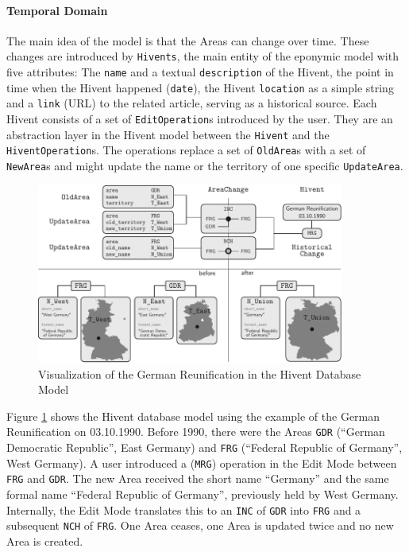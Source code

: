 
\paragraph{Temporal Domain} %
\label{par:temporal_domain}

The main idea of the model is that the Areas can change over time. These changes are introduced by \texttt{Hivents}, the main entity of the eponymic model with five attributes: The \texttt{name} and a textual \texttt{description} of the Hivent, the point in time when the Hivent happened (\texttt{date}), the Hivent \texttt{location} as a simple string and a \texttt{link} (URL) to the related article, serving as a historical source.
Each Hivent consists of a set of \texttt{EditOperation}s introduced by the user.
They are an abstraction layer in the Hivent model between the \texttt{Hivent} and the \texttt{HiventOperation}s.
The operations replace a set of \texttt{OldArea}s with a set of \texttt{NewArea}s and might update the name or the territory of one specific \texttt{UpdateArea}.



\begin{figure}[ht]
  \vspace{1.5em}
  \includegraphics[width=0.9\textwidth]{graphics/development/implementation/example_reunification}
  \caption{Visualization of the German Reunification in the Hivent Database Model}
  \label{fig:database_example_reunification}
\end{figure}

Figure \ref{fig:database_example_reunification} shows the Hivent database model using the example of the German Reunification on 03.10.1990. Before 1990, there were the Areas \texttt{GDR} (``German Democratic Republic'', East Germany) and \texttt{FRG} (``Federal Republic of Germany'', West Germany). A user introduced a (\texttt{MRG}) operation in the Edit Mode between \texttt{FRG} and \texttt{GDR}. The new Area received the short name ``Germany'' and the same formal name ``Federal Republic of Germany'', previously held by West Germany. Internally, the Edit Mode translates this to an \texttt{INC} of \texttt{GDR} into \texttt{FRG} and a subsequent \texttt{NCH} of \texttt{FRG}. One Area ceases, one Area is updated twice and no new Area is created.

